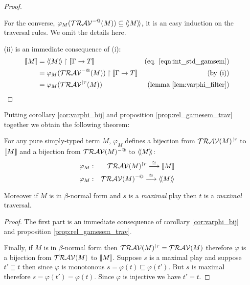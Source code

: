 \begin{proof}
\begin{itemize}
  For the converse, $\varphi_{M}( \mathcal{TRAV}^{-@}(M) ) \subseteq {\langle\!\langle M \rangle\!\rangle}$, it is an easy induction
  on the traversal rules. We omit the details here.
\end{itemize}

(ii) is an immediate consequence of (i):
\begin{align*}
\sem{M} &= \intersem{M} \upharpoonright \sem{\Gamma \rightarrow T} & \mbox{(eq. \ref{eqn:int_std_gamsem})} \\
        &= \varphi_M(\travset^{-@}(M)) \upharpoonright \sem{\Gamma \rightarrow T} & \mbox{(by (i))}\\
        &= \varphi_M(\travset^{\upharpoonright r}(M)) & \mbox{(lemma \ref{lem:varphi_filter})}\\
\end{align*}
\end{proof}


Putting corollary \ref{cor:varphi_bij} and proposition
\ref{prop:rel_gamesem_trav} together we obtain the following
theorem:

\begin{thm}
For any pure simply-typed term $M$, $\varphi_M$ defines a bijection from
$\mathcal{TRAV}(M)^{\upharpoonright r}$ to ${[\![ M ]\!]}$ and a bijection
from $\mathcal{TRAV}(M)^{-@}$ to ${\langle\!\langle M \rangle\!\rangle}$:
\begin{eqnarray*}
 \varphi_M  &:& \mathcal{TRAV}(M)^{\upharpoonright r} \stackrel{\cong}{\longrightarrow} {[\![ M ]\!]} \\
 \varphi_M  &:& \mathcal{TRAV}(M)^{-@} \stackrel{\cong}{\longrightarrow} {\langle\!\langle M \rangle\!\rangle}
\end{eqnarray*}

Moreover if $M$ is in $\beta$-normal form and $s$ is a
\emph{maximal} play then  $t$ is a \emph{maximal} traversal.
\end{thm}

\begin{proof}
The first part is an immediate consequence of corollary
\ref{cor:varphi_bij} and proposition
\ref{prop:rel_gamesem_trav}.

Finally, if $M$ is in $\beta$-normal form then
$\mathcal{TRAV}(M)^{\upharpoonright r} = \mathcal{TRAV}(M)$
therefore $\varphi$ is a bijection from $\mathcal{TRAV}(M)$ to
${[\![ M ]\!]}$. Suppose $s$ is a maximal play and suppose $t' \sqsubseteq
t$ then since $\varphi$ is monotonous $s = \varphi(t) \sqsubseteq
\varphi(t')$. But $s$ is maximal therefore $s = \varphi(t') =
\varphi(t)$. Since $\varphi$ is injective we have $t'=t$.
\end{proof}

